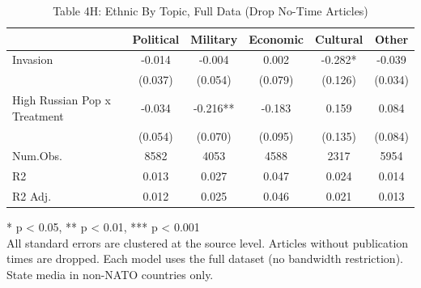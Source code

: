 \begin{table}[!t]
\caption{Table 4H: Ethnic By Topic, Full Data (Drop No-Time Articles)} 
\fontsize{12.0pt}{14.4pt}\selectfont
\begin{tabular*}{\linewidth}{@{\extracolsep{\fill}}lccccc}
\toprule
  & Political & Military & Economic & Cultural & Other \\ 
\midrule\addlinespace[2.5pt]
Invasion & -0.014 & -0.004 & 0.002 & -0.282* & -0.039 \\ 
 & (0.037) & (0.054) & (0.079) & (0.126) & (0.034) \\ 
High Russian Pop x Treatment & -0.034 & -0.216** & -0.183 & 0.159 & 0.084 \\ 
{} & {(0.054)} & {(0.070)} & {(0.095)} & {(0.135)} & {(0.084)} \\ 
Num.Obs. & 8582 & 4053 & 4588 & 2317 & 5954 \\ 
R2 & 0.013 & 0.027 & 0.047 & 0.024 & 0.014 \\ 
R2 Adj. & 0.012 & 0.025 & 0.046 & 0.021 & 0.013 \\ 
\bottomrule
\end{tabular*}
\begin{minipage}{\linewidth}
* p < 0.05, ** p < 0.01, *** p < 0.001\\
All standard errors are clustered at the source level. Articles without
publication times are dropped. Each model uses the full dataset (no bandwidth
restriction). State media in non-NATO countries only.\\
\end{minipage}
\end{table}

